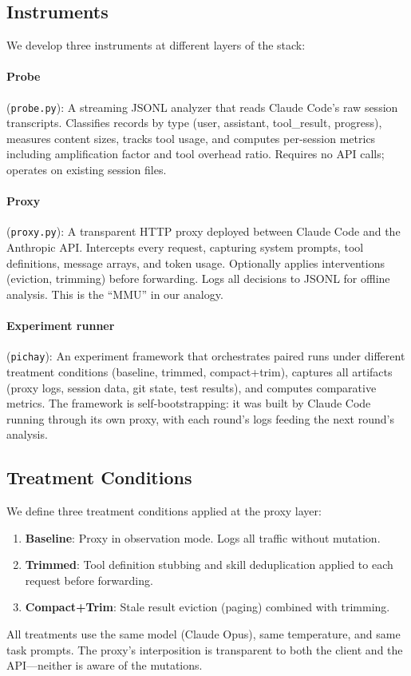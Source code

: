 \subsection{Instruments}

We develop three instruments at different layers of the stack:

\paragraph{Probe} (\texttt{probe.py}): A streaming JSONL analyzer
that reads Claude Code's raw session transcripts. Classifies records
by type (user, assistant, tool\_result, progress), measures content
sizes, tracks tool usage, and computes per-session metrics including
amplification factor and tool overhead ratio. Requires no API calls;
operates on existing session files.

\paragraph{Proxy} (\texttt{proxy.py}): A transparent HTTP proxy
deployed between Claude Code and the Anthropic API. Intercepts
every request, capturing system prompts, tool definitions, message
arrays, and token usage. Optionally applies interventions (eviction,
trimming) before forwarding. Logs all decisions to JSONL for offline
analysis. This is the ``MMU'' in our analogy.

\paragraph{Experiment runner} (\texttt{pichay}): An experiment
framework that orchestrates paired runs under different treatment
conditions (baseline, trimmed, compact+trim), captures all
artifacts (proxy logs, session data, git state, test results),
and computes comparative metrics. The framework is self-bootstrapping:
it was built by Claude Code running through its own proxy, with
each round's logs feeding the next round's analysis.

\subsection{Treatment Conditions}

We define three treatment conditions applied at the proxy layer:

\begin{enumerate}[nosep]
  \item \textbf{Baseline}: Proxy in observation mode. Logs all
    traffic without mutation.
  \item \textbf{Trimmed}: Tool definition stubbing and skill
    deduplication applied to each request before forwarding.
  \item \textbf{Compact+Trim}: Stale result eviction (paging)
    combined with trimming.
\end{enumerate}

All treatments use the same model (Claude Opus), same temperature,
and same task prompts. The proxy's interposition is transparent to
both the client and the API---neither is aware of the mutations.

